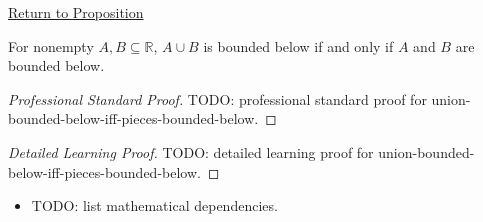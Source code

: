 \newpage
{}
\label{prf:union-bounded-below-iff-pieces-bounded-below}

\begin{remark*}[Return]
\hyperref[prop:union-bounded-below-iff-pieces-bounded-below]{Return to Proposition}
\end{remark*}

\begin{proposition*}
For nonempty $A,B\subseteq\mathbb{R}$, $A\cup B$ is bounded below if and only
if $A$ and $B$ are bounded below.
\end{proposition*}

\begin{proof}[Professional Standard Proof]
\LRAProofBodyStart
TODO: professional standard proof for union-bounded-below-iff-pieces-bounded-below.
\end{proof}

\begin{proof}[Detailed Learning Proof]
\LRAProofBodyStart
TODO: detailed learning proof for union-bounded-below-iff-pieces-bounded-below.
\end{proof}

\begin{remark*}
\end{remark*}

\begin{dependencies}
\begin{itemize}
  \item TODO: list mathematical dependencies.
\end{itemize}
\end{dependencies}

\clearpage
